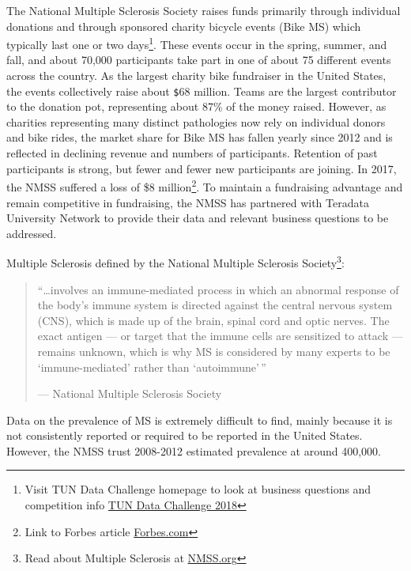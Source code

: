\documentclass[]{article}
\let\rmarkdownfootnote\footnote%
\def\footnote{\protect\rmarkdownfootnote}
\begin{document}
The National Multiple Sclerosis Society raises funds primarily through
individual donations and through sponsored charity bicycle events (Bike
MS) which typically last one or two days\footnote{Visit TUN Data
  Challenge homepage to look at business questions and competition info
  \href{http://www.teradatauniversitynetwork.com/Community/Student-Competitions/2018/Data-Challenge/Business-Questions/}{TUN
  Data Challenge 2018}}. These events occur in the spring, summer, and
fall, and about 70,000 participants take part in one of about 75
different events across the country. As the largest charity bike
fundraiser in the United States, the events collectively raise about
\texttt{\$}68 million. Teams are the largest contributor to the donation
pot, representing about 87\% of the money raised. However, as charities
representing many distinct pathologies now rely on individual donors and
bike rides, the market share for Bike MS has fallen yearly since 2012
and is reflected in declining revenue and numbers of participants.
Retention of past participants is strong, but fewer and fewer new
participants are joining. In 2017, the NMSS suffered a loss of \$8
million\footnote{Link to Forbes article
  \href{https://www.forbes.com/companies/national-multiple-sclerosis-society/}{Forbes.com}}.
To maintain a fundraising advantage and remain competitive in
fundraising, the NMSS has partnered with Teradata University Network to
provide their data and relevant business questions to be addressed.

Multiple Sclerosis defined by the National Multiple Sclerosis
Society\footnote{Read about Multiple Sclerosis at
  \href{https://www.nationalmssociety.org/About-the-Society/MS-Prevalence}{NMSS.org}}:

\begin{quote}
``\ldots{}involves an immune-mediated process in which an abnormal
response of the body's immune system is directed against the central
nervous system (CNS), which is made up of the brain, spinal cord and
optic nerves. The exact antigen --- or target that the immune cells are
sensitized to attack --- remains unknown, which is why MS is considered
by many experts to be `immune-mediated' rather than `autoimmune'\,''

\hfill --- National Multiple Sclerosis Society
\end{quote}

Data on the prevalence of MS is extremely difficult to find, mainly
because it is not consistently reported or required to be reported in
the United States. However, the NMSS trust 2008-2012 estimated
prevalence at around 400,000.
\end{document}
